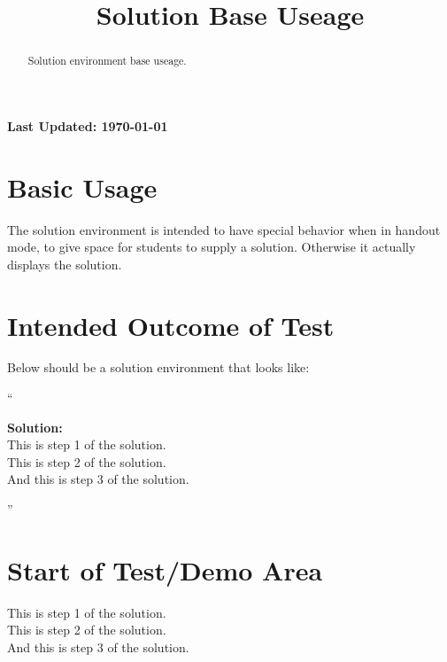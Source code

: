 \documentclass{ximera}
\title{Solution Base Useage}
\begin{document}
\begin{abstract}
    Solution environment base useage.
\end{abstract}
\maketitle

{{\Huge \bfseries Last Updated: \today}} \\


\section{Basic Usage}
The solution environment is intended to have special behavior when in handout mode, to give space for students to supply a solution.
Otherwise it actually displays the solution.

\section{Intended Outcome of Test}
Below should be a solution environment that looks like:

``

\textbf{Solution:}\\
This is step 1 of the solution.\\
This is step 2 of the solution.\\
And this is step 3 of the solution.

''

\section{Start of Test/Demo Area}
\begin{solution}
This is step 1 of the solution.\\
This is step 2 of the solution.\\
And this is step 3 of the solution.
\end{solution}

\hrulefill
\end{document}
